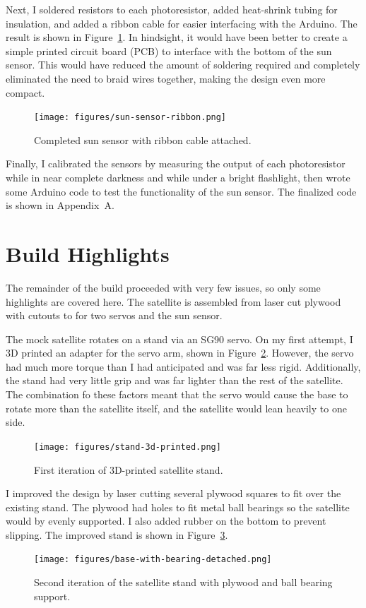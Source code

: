 Next, I soldered resistors to each photoresistor, added heat-shrink tubing for insulation, and added a ribbon cable for easier interfacing with the Arduino. The result is shown in Figure~\ref{fig:sun-sensor-ribbon}. In hindsight, it would have been better to create a simple printed circuit board (PCB) to interface with the bottom of the sun sensor. This would have reduced the amount of soldering required and completely eliminated the need to braid wires together, making the design even more compact. 
\begin{figure}[!ht]
    \centering
    \texttt{[image: figures/sun-sensor-ribbon.png]}
    \caption{Completed sun sensor with ribbon cable attached.}
    \label{fig:sun-sensor-ribbon}
\end{figure}

Finally, I calibrated the sensors by measuring the output of each photoresistor while in near complete darkness and while under a bright flashlight, then wrote some Arduino code to test the functionality of the sun sensor. The finalized code is shown in Appendix~A.



\section{Build Highlights}
\label{sec:highlights}

The remainder of the build proceeded with very few issues, so only some highlights are covered here. The satellite is assembled from laser cut plywood with cutouts to for two servos and the sun sensor.

The mock satellite rotates on a stand via an SG90 servo. On my first attempt, I 3D printed an adapter for the servo arm, shown in Figure~\ref{fig:stand-3d-printed}. However, the servo had much more torque than I had anticipated and was far less rigid. Additionally, the stand had very little grip and was far lighter than the rest of the satellite. The combination fo these factors meant that the servo would cause the base to rotate more than the satellite itself, and the satellite would lean heavily to one side. 
\begin{figure}[!ht]
    \centering
    \texttt{[image: figures/stand-3d-printed.png]}
    \caption{First iteration of 3D-printed satellite stand. }
    \label{fig:stand-3d-printed}
\end{figure}

I improved the design by laser cutting several plywood squares to fit over the existing stand. The plywood had holes to fit metal ball bearings so the satellite would by evenly supported. I also added rubber on the bottom to prevent slipping. The improved stand is shown in Figure~\ref{fig:base-with-bearing-detached}.
\begin{figure}[!ht]
    \centering
    \texttt{[image: figures/base-with-bearing-detached.png]}
    \caption{Second iteration of the satellite stand with plywood and ball bearing support.}
    \label{fig:base-with-bearing-detached}
\end{figure}

